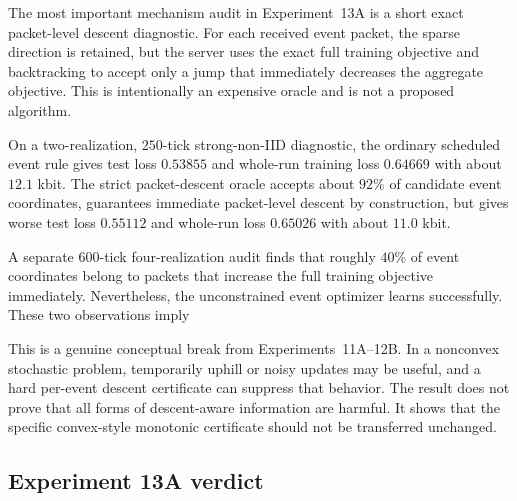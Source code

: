 The most important mechanism audit in Experiment~13A is a short exact packet-level descent diagnostic. For each received event packet, the sparse direction is retained, but the server uses the exact full training objective and backtracking to accept only a jump that immediately decreases the aggregate objective. This is intentionally an expensive oracle and is not a proposed algorithm.

On a two-realization, $250$-tick strong-non-IID diagnostic, the ordinary scheduled event rule gives test loss $0.53855$ and whole-run training loss $0.64669$ with about $12.1$ kbit. The strict packet-descent oracle accepts about $92\%$ of candidate event coordinates, guarantees immediate packet-level descent by construction, but gives worse test loss $0.55112$ and whole-run loss $0.65026$ with about $11.0$ kbit.

A separate $600$-tick four-realization audit finds that roughly $40\%$ of event coordinates belong to packets that increase the full training objective immediately. Nevertheless, the unconstrained event optimizer learns successfully. These two observations imply
\begin{center}
\end{center}
This is a genuine conceptual break from Experiments~11A--12B. In a nonconvex stochastic problem, temporarily uphill or noisy updates may be useful, and a hard per-event descent certificate can suppress that behavior. The result does not prove that all forms of descent-aware information are harmful. It shows that the specific convex-style monotonic certificate should not be transferred unchanged.

\subsection{Experiment 13A verdict}

